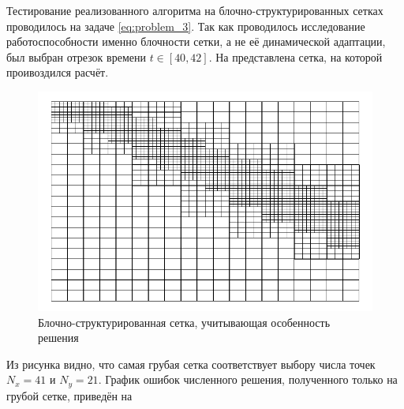 Тестирование реализованного алгоритма на блочно-структурированных сетках проводилось на задаче \eqref{eq:problem_3}.
Так как проводилось исследование работоспособности именно блочности сетки, а не её динамической адаптации, был выбран отрезок времени $t \in [40, 42]$.
На  представлена сетка, на которой проивоздился расчёт.
\begin{figure}[h]
    \centering
    \includegraphics[width=\textwidth, height=\textheight, keepaspectratio]{Теория_блочных_локально_адаптивных_сеток/Результаты_моделирования/grid.pdf}
    \caption{Блочно-структурированная сетка, учитывающая особенность решения}
    \label{fig:block_structured_grid}
\end{figure}
Из рисунка видно, что самая грубая сетка соответствует выбору числа точек $N_x = 41$ и $N_y = 21$.
График ошибок численного решения, полученного только на грубой сетке, приведён на 
